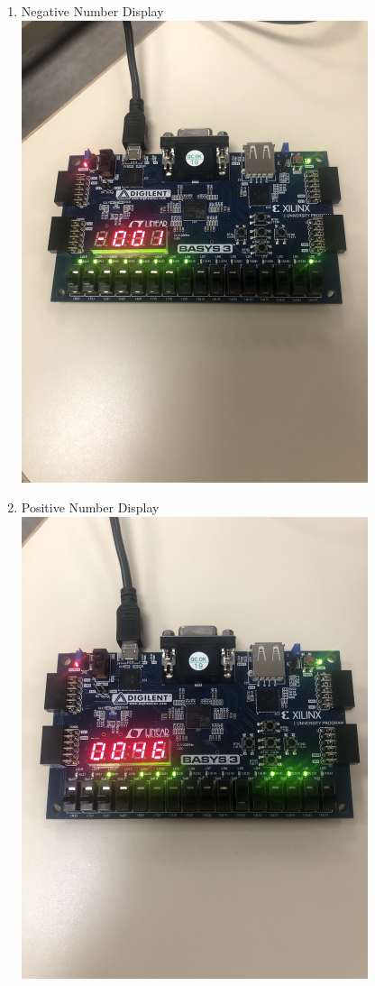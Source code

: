 \documentclass[11pt]{article}
\begin{document}
\begin{enumerate}
	\item Negative Number Display 
	\includegraphics[width=0.8\textwidth, angle = 270]{negativeOne.jpg}
	\label{fig:Negative Number Display}
	
	\item Positive Number Display 
	\includegraphics[width=0.8\textwidth, angle = 270]{positveNum.jpg}
	\label{fig:Positive Number Display}
\end{enumerate}
\end{document}

